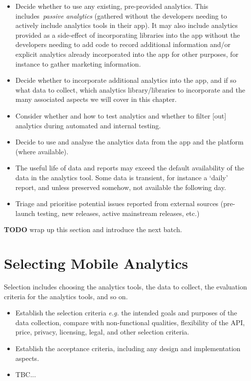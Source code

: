 \begin{itemize}
    \item Decide whether to use any existing, pre-provided analytics. This includes~\emph{passive analytics} (gathered without the developers needing to actively include analytics tools in their app). It may also include analytics provided as a side-effect of incorporating libraries into the app without the developers needing to add code to record additional information and/or explicit analytics already incorporated into the app for other purposes, for instance to gather marketing information. 
    \item Decide whether to incorporate additional analytics into the app, and if so what data to collect, which analytics library/libraries to incorporate and the many associated aspects we will cover in this chapter.
    \item Consider whether and how to test analytics and whether to filter [out] analytics during automated and internal testing.
    \item Decide to use and analyse the analytics data from the app and the platform (where available).
    \item The useful life of data and reports may exceed the default availability of the data in the analytics tool. Some data is transient, for instance a `daily' report, and unless preserved somehow, not available the following day.
    \item Triage and prioritise potential issues reported from external sources (pre-launch testing, new releases, active mainstream releases, etc.)
\end{itemize}

\textbf{TODO} wrap up this section and introduce the next batch.


\section{Selecting Mobile Analytics}
Selection includes choosing the analytics tools, the data to collect, the evaluation criteria for the analytics tools, and so on.
\begin{itemize}
    \item Establish the selection criteria \emph{e.g.} the intended goals and purposes of the data collection, compare with non-functional qualities, flexibility of the API, price, privacy, licensing, legal, and other selection criteria.
    \item Establish the acceptance criteria, including any design and implementation aspects.
    \item TBC...
\end{itemize}




